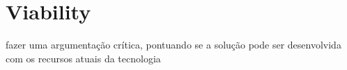 \section{Viability}

fazer uma argumentação crítica, pontuando se a solução pode ser desenvolvida com os recursos atuais da tecnologia